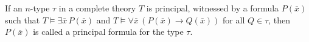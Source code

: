 If an $n$-type $\tau$ in a complete theory $T$ is principal, witnessed by a formula $P(\bar{x})$ such that $T \models \exists \bar{x}\, P(\bar{x})$ and $T \models \forall \bar{x}\,(P(\bar{x}) \to Q(\bar{x}))$ for all $Q \in \tau$, then $P(\bar{x})$ is called a principal formula for the type $\tau$.
